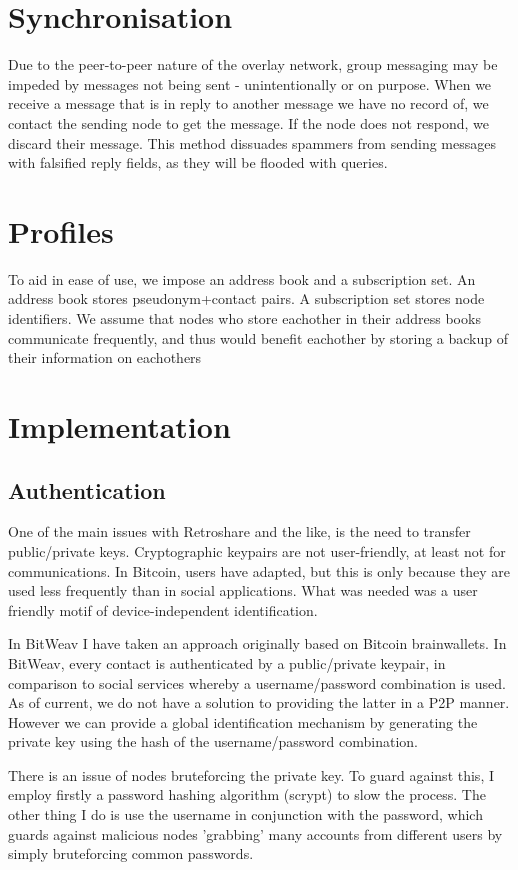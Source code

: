 \documentclass[10pt,a4paper,onecolumn]{article}
\begin{document}
\section{Synchronisation}
Due to the peer-to-peer nature of the overlay network, group messaging may be impeded by messages not being sent - unintentionally or on purpose. When we receive a message that is in reply to another message we have no record of, we contact the sending node to get the message. If the node does not respond, we discard their message. This method dissuades spammers from sending messages with falsified reply fields, as they will be flooded with queries. 


\section{Profiles}
To aid in ease of use, we impose an address book and a subscription set. An address book stores pseudonym+contact pairs. A subscription set stores node identifiers. We assume that nodes who store eachother in their address books communicate frequently, and thus would benefit eachother by storing a backup of their information on eachothers 


\section{Implementation}
\subsection{Authentication}
One of the main issues with Retroshare and the like, is the need to transfer public/private keys. Cryptographic keypairs are not user-friendly, at least not for communications. In Bitcoin, users have adapted, but this is only because they are used less frequently than in social applications. What was needed was a user friendly motif of device-independent identification. 

In BitWeav I have taken an approach originally based on Bitcoin brainwallets. In BitWeav, every contact is authenticated by a public/private keypair, in comparison to social services whereby a username/password combination is used. As of current, we do not have a solution to providing the latter in a P2P manner. However we can provide a global identification mechanism by generating the private key using the hash of the username/password combination. 

There is an issue of nodes bruteforcing the private key. To guard against this, I employ firstly a password hashing algorithm (scrypt) to slow the process. The other thing I do is use the username in conjunction with the password, which guards against malicious nodes 'grabbing' many accounts from different users by simply bruteforcing common passwords. 
\end{document}
